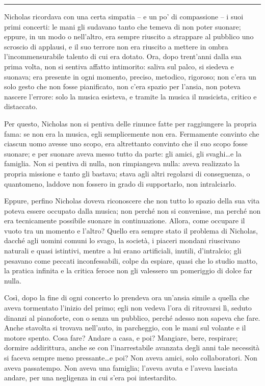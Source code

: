 \plainbreak{1}

Nicholas ricordava con una certa simpatia -- e un po' di compassione -- i suoi primi concerti: le
mani gli sudavano tanto che temeva di non poter suonare; eppure, in un modo o nell'altro, era sempre
riuscito a strappare al pubblico uno scroscio di applausi, e il suo terrore non era riuscito a
mettere in ombra l'incommensurabile talento di cui era dotato. Ora, dopo trent'anni dalla sua prima
volta, non si sentiva affatto intimorito: saliva sul palco, si siedeva e suonava; era presente in
ogni momento, preciso, metodico, rigoroso; non c'era un solo gesto che non fosse pianificato, non
c'era spazio per l'ansia, non poteva nascere l'errore: solo la musica esisteva, e tramite la musica
il musicista, critico e distaccato.

Per questo, Nicholas non si pentiva delle rinunce fatte per raggiungere la propria fama: se non era
la musica, egli semplicemente non era. Fermamente convinto che ciascun uomo avesse uno scopo, era
altrettanto convinto che il suo scopo fosse suonare; e per suonare aveva messo tutto da parte: gli
amici, gli svaghi\dots e la famiglia. Non si pentiva di nulla, non rimpiangeva nulla: aveva
realizzato la propria missione e tanto gli bastava; stava agli altri regolarsi di conseguenza, o
quantomeno, laddove non fossero in grado di supportarlo, non intralciarlo.

Eppure, perfino Nicholas doveva riconoscere che non tutto lo spazio della sua vita poteva essere
occupato dalla musica; non perché non si convenisse, ma perché non era tecnicamente possibile
suonare in continuazione. Allora, come occupare il vuoto tra un momento e l'altro? Quello era sempre
stato il problema di Nicholas, dacché agli uomini comuni lo svago, la società, i piaceri mondani
riuscivano naturali e quasi istintivi, mentre a lui erano artificiali, inutili, d'intralcio; gli
pesavano come peccati inconfessabili, colpe da espiare, quasi che lo studio matto, la pratica
infinita e la critica feroce non gli valessero un pomeriggio di dolce far nulla.

Così, dopo la fine di ogni concerto lo prendeva ora un'ansia simile a quella che aveva tormentato
l'inizio del primo; egli non vedeva l'ora di ritrovarsi lì, seduto dinanzi al pianoforte, con o
senza un pubblico, perché adesso non sapeva che fare. Anche stavolta si trovava nell'auto, in
parcheggio, con le mani sul volante e il motore spento. Cosa fare? Andare a casa, e poi? Mangiare,
bere, respirare; dormire addirittura, anche se con l'inarrestabile avanzata degli anni tale
necessità si faceva sempre meno pressante\dots e poi? Non aveva amici, solo collaboratori. Non aveva
passatempo. Non aveva una famiglia; l'aveva avuta e l'aveva lasciata andare, per una negligenza in
cui s'era poi intestardito.

